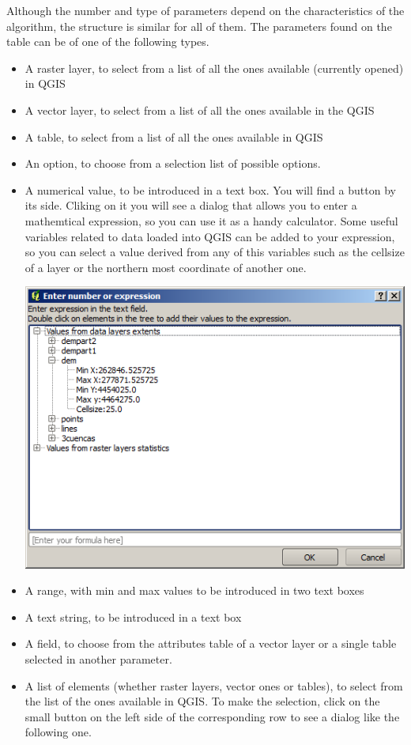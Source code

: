 Although the number and type of parameters depend on the characteristics of the algorithm, the structure is similar for all of them. The parameters found on the table can be of one of the following types.

\begin{itemize}
	\item A raster layer, to select from a list of all the ones available (currently opened) in QGIS
	\item A vector layer, to select from a list of all the ones available in the QGIS
	\item A table, to select from a list of all the ones available in QGIS
	\item An option, to choose from a selection list of possible options. 	
	\item A numerical value, to be introduced in a text box. You will find a button by its side. Cliking on it you will see a dialog that allows you to enter a mathemtical expression, so you can use it as a handy calculator. Some useful variables related to data loaded into QGIS can be added to your expression, so you can select a value derived from any of this variables such as the cellsize of a layer or the northern most coordinate of another one.
	\begin{center}
\includegraphics[width=.6\columnwidth]{number_selector.png}
\end{center}
	\item A range, with min and max values to be introduced in two text boxes
	\item A text string, to be introduced in a text box
	\item A field, to choose from the attributes table of a vector layer or a single table selected in another parameter.
	\item A list of elements (whether raster layers, vector ones or tables), to select from the list of the ones available in QGIS. To make the selection, click on the small button on the left side of the corresponding row to see a dialog like the following one.

\end{itemize}
